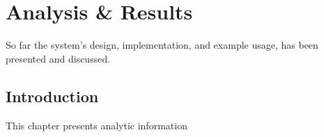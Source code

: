 \chapter{Analysis \& Results}
\startcontents[chapters]

So far the system's design, implementation, and example usage, has been presented and discussed.

\section{Introduction}
This chapter presents analytic information